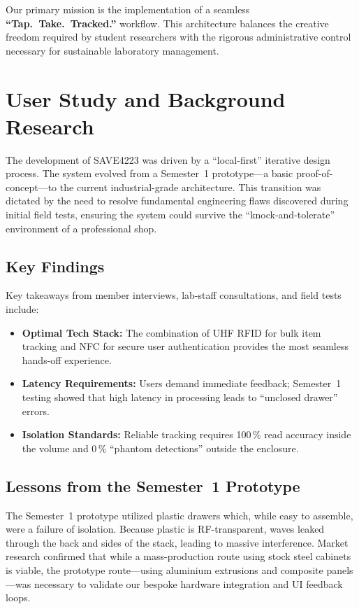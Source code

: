 \documentclass[12pt, a4paper]{article}
\begin{document}
Our primary mission is the implementation of a seamless \textbf{``Tap.\ Take.\ Tracked.''} workflow.
This architecture balances the creative freedom required by student researchers with the rigorous administrative control necessary for sustainable laboratory management.

\section{User Study and Background Research}
\label{sec:userstudy}

The development of SAVE4223 was driven by a ``local-first'' iterative design process.
The system evolved from a Semester~1 prototype---a basic proof-of-concept---to the current industrial-grade architecture.
This transition was dictated by the need to resolve fundamental engineering flaws discovered during initial field tests, ensuring the system could survive the ``knock-and-tolerate'' environment of a professional shop.

\subsection*{Key Findings}

Key takeaways from member interviews, lab-staff consultations, and field tests include:

\begin{itemize}[nosep]
  \item \textbf{Optimal Tech Stack:} The combination of UHF RFID for bulk item tracking and NFC for secure user authentication provides the most seamless hands-off experience.
  \item \textbf{Latency Requirements:} Users demand immediate feedback; Semester~1 testing showed that high latency in processing leads to ``unclosed drawer'' errors.
  \item \textbf{Isolation Standards:} Reliable tracking requires 100\,\% read accuracy inside the volume and 0\,\% ``phantom detections'' outside the enclosure.
\end{itemize}

\subsection*{Lessons from the Semester~1 Prototype}

The Semester~1 prototype utilized plastic drawers which, while easy to assemble, were a failure of isolation.
Because plastic is RF-transparent, waves leaked through the back and sides of the stack, leading to massive interference.
Market research confirmed that while a mass-production route using stock steel cabinets is viable, the prototype route---using aluminium extrusions and composite panels---was necessary to validate our bespoke hardware integration and UI feedback loops.
\end{document}
